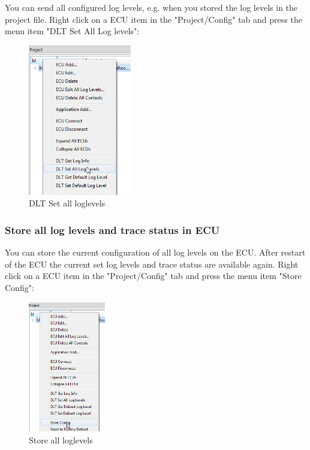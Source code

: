 \documentclass[a4paper,11pt]{article}
\begin{document}
You can send all configured log levels, e.g. when you stored the log levels in the project file.
Right click on a ECU item in the "Project/Config" tab and press the menu item "DLT Set All Log levels":

\begin{figure}[H]
 \centering
  \includegraphics[width=0.4\textwidth]{images/setallloglevels.png}
 \caption{DLT Set all loglevels}
 \label{fig:setallloglevels}
\end{figure}


\subsubsection{Store all log levels and trace status in ECU}

You can store the current configuration of all log levels on the ECU. After restart of the ECU
the current set log levels and trace status are available again.
Right click on a ECU item in the "Project/Config" tab and press the menu item "Store Config":

\begin{figure}[H]
 \centering
  \includegraphics[width=0.3\textwidth]{images/storeloglevel.png}
 \caption{Store all loglevels}
 \label{fig:storeloglevels}
\end{figure}
\end{document}
